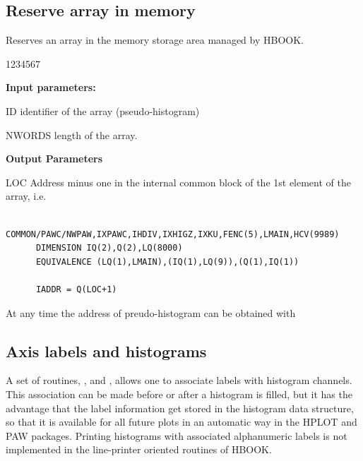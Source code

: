 
\subsection{Reserve array in memory}


\Action Reserves an array in the memory storage area managed by HBOOK.

\begin{DLttc}{1234567}
\item[{\rm\bf Input parameters:}]
\item[ID] identifier of the array (pseudo-histogram)
\item[NWORDS] length of the array.
\item[{\rm\bf Output Parameters}]
\item[LOC] Address minus one in the internal \HBOOK{}
           common block 
           of the 1st element of the array, i.e.
\begin{verbatim}
      COMMON/PAWC/NWPAW,IXPAWC,IHDIV,IXHIGZ,IXKU,FENC(5),LMAIN,HCV(9989)
      DIMENSION IQ(2),Q(2),LQ(8000)
      EQUIVALENCE (LQ(1),LMAIN),(IQ(1),LQ(9)),(Q(1),IQ(1))

      IADDR = Q(LOC+1)
\end{verbatim}
\end{DLttc}

\Remark
At any time the address of preudo-histogram  can
be obtained with 


\subsection{Axis labels and histograms}

A set of routines, ,  and ,
allows one to associate labels with histogram channels.
This association can be made before or after a histogram is filled, but 
it has the advantage that the label information get stored in the
histogram data structure, so that it is available for all future plots in
an automatic way in the HPLOT and PAW packages.
Printing histograms with associated alphanumeric
labels is not implemented in the
line-printer oriented routines of HBOOK.

